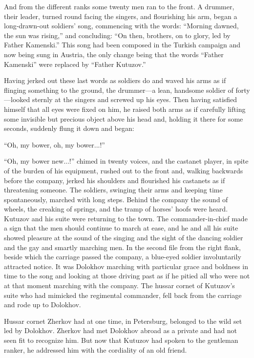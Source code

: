 And from the different ranks some twenty men ran to the front. A
drummer, their leader, turned round facing the singers, and
flourishing his arm, began a long-drawn-out soldiers' song,
commencing with the words: ``Morning dawned, the sun was
rising,'' and concluding: ``On then, brothers, on to glory, led
by Father Kamenski.'' This song had been composed in the Turkish
campaign and now being sung in Austria, the only change being
that the words ``Father Kamenski'' were replaced by ``Father
Kutuzov.''

Having jerked out these last words as soldiers do and waved his
arms as if flinging something to the ground, the drummer---a
lean, handsome soldier of forty---looked sternly at the singers
and screwed up his eyes.  Then having satisfied himself that all
eyes were fixed on him, he raised both arms as if carefully
lifting some invisible but precious object above his head and,
holding it there for some seconds, suddenly flung it down and
began:

``Oh, my bower, oh, my bower...!''

``Oh, my bower new...!'' chimed in twenty voices, and the
castanet player, in spite of the burden of his equipment, rushed
out to the front and, walking backwards before the company,
jerked his shoulders and flourished his castanets as if
threatening someone. The soldiers, swinging their arms and
keeping time spontaneously, marched with long steps. Behind the
company the sound of wheels, the creaking of springs, and the
tramp of horses' hoofs were heard. Kutuzov and his suite were
returning to the town. The commander-in-chief made a sign that
the men should continue to march at ease, and he and all his
suite showed pleasure at the sound of the singing and the sight
of the dancing soldier and the gay and smartly marching men. In
the second file from the right flank, beside which the carriage
passed the company, a blue-eyed soldier involuntarily attracted
notice. It was Dolokhov marching with particular grace and
boldness in time to the song and looking at those driving past as
if he pitied all who were not at that moment marching with the
company. The hussar cornet of Kutuzov's suite who had mimicked
the regimental commander, fell back from the carriage and rode up
to Dolokhov.

Hussar cornet Zherkov had at one time, in Petersburg, belonged to
the wild set led by Dolokhov. Zherkov had met Dolokhov abroad as
a private and had not seen fit to recognize him. But now that
Kutuzov had spoken to the gentleman ranker, he addressed him with
the cordiality of an old friend.

